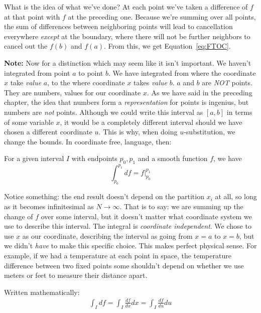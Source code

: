 \documentclass[../master.tex]{subfiles}
\begin{document}
	What is the idea of what we've done? At each point we've taken a difference of $f$ at that point with $f$ at the preceding one. Because we're summing over all points, the sum of differences between neighboring points will lead to cancellation everywhere \emph{except} at the boundary, where there will not be further neighbors to cancel out the $f(b)$ and $f(a)$. From this, we get Equation~\eqref{eq:FTOC}. 
	
\noindent \textbf{Note:}
	Now for a distinction which may seem like it isn't important. We haven't integrated from point $a$ to point $b$. We have integrated from where the coordinate $x$ take \emph{value} $a$, to the where coordinate $x$ takes \emph{value} $b$. $a$ and $b$ are \emph{NOT} points. They are numbers, values for our coordinate $x$. As we have said in the preceding chapter, the idea that numbers form a \emph{representation} for points is ingenius, but numbers are \emph{not} points. Although we could write this interval as $[a,b]$ in terms of some variable $x$, it would be a completely different interval should we have chosen a different coordinate $u$. This is why, when doing $u$-substitution, we change the bounds. In coordinate free, language, then:

	
	\begin{theorem}\label{thm:FTOC}
		For a given interval $I$ with endpoints $p_0, p_1$ and a smooth function $f$, we have
		\begin{equation}
			  \int_{p_0}^{p_1} df = f \Big\rvert_{p_0}^{p_1} 
		\end{equation}
	\end{theorem}
	Notice something: the end result doesn't depend on the partition $x_i$ at all, so long as it becomes infinitesimal as $N \rightarrow \infty$. That is to say: we are summing up the change of $f$ over some interval, but it doesn't matter what coordinate system we use to describe this interval. The integral is \emph{coordinate independent}. We chose to use $x$ as our coordinate, describing the interval as going from $x=a$ to $x=b$, but we didn't \emph{have} to make this specific choice. This makes perfect physical sense. For example, if we had a temperature at each point in space, the temperature difference between two fixed points some shouldn't depend on whether we use meters or feet to measure their distance apart.  
	
	Written mathematically: 
	\begin{align*}
		\int_I df = \int_I \frac{df}{dx} dx = \int_I \frac{df}{du} du 
	\end{align*}
	
\end{document}
